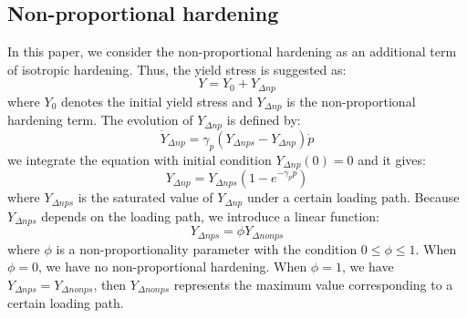 \subsection{Non-proportional hardening}
\noindent
In this paper, we consider the non-proportional hardening as an additional term of isotropic hardening.
Thus, the yield stress is suggested as:
\begin{equation}
Y = {Y_0} + {Y_{\Delta np}}
\end{equation}
where $Y_0$ denotes the initial yield stress and ${Y_{\Delta np}}$ is the non-proportional hardening term.
The evolution of ${Y_{\Delta np}}$ is defined by:
\begin{equation}
{\dot Y_{\Delta np}} = {\gamma _p}\left( {{Y_{\Delta nps}} - {Y_{\Delta np}}} \right)\dot p
\end{equation}
we integrate the equation with initial condition ${Y_{\Delta np}}(0)=0$ and it gives:
\begin{equation}
{Y_{\Delta np}} = Y_{\Delta nps}\left( 1-e^{- \gamma_p p} \right)
\end{equation}
where $Y_{\Delta nps}$ is the saturated value of ${Y_{\Delta np}}$ under a certain loading path.
Because ${Y_{\Delta nps}}$ depends on the loading path, we introduce a linear function:
\begin{equation}
{Y_{\Delta nps}} = \phi {Y_{\Delta nonps}}
\end{equation}
where $\phi$ is a non-proportionality parameter with the condition $0 \leq \phi \leq 1$.
When $\phi = 0$, we have no non-proportional hardening.
When $\phi = 1$, we have ${Y_{\Delta nps}} = {Y_{\Delta nonps}}$, then ${Y_{\Delta nonps}}$ represents the maximum value corresponding to a certain loading path.

